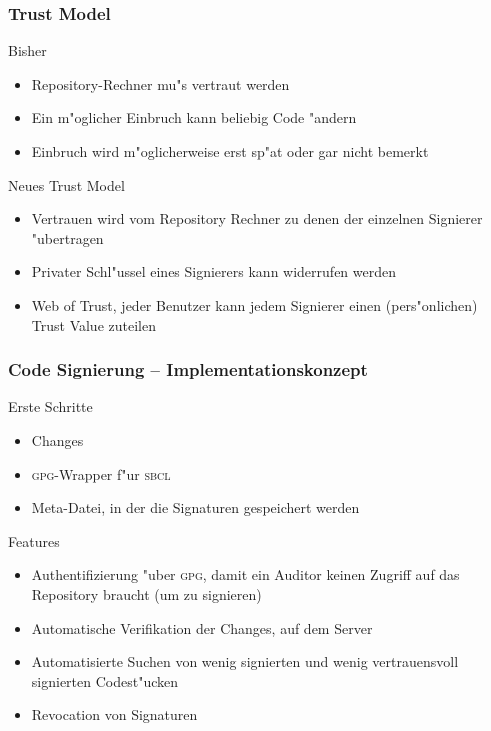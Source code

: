 \documentclass[german, presentation]{beamer}
\newcommand{\GPG}{\textsc{gpg}}
\newcommand{\SBCL}{\textsc{sbcl}}
\begin{document}
\begin{frame}
  \frametitle{Trust Model}
  \begin{block}{Bisher}
    \begin{itemize}
      \item Repository-Rechner mu"s vertraut werden
      \item Ein m"oglicher Einbruch kann beliebig Code "andern
      \item Einbruch wird m"oglicherweise erst sp"at oder gar nicht bemerkt
    \end{itemize}
  \end{block}
  \begin{block}{Neues Trust Model}
    \begin{itemize}
      \item Vertrauen wird vom Repository Rechner zu denen
         der einzelnen Signierer "ubertragen
      \item Privater Schl"ussel eines Signierers kann widerrufen werden
      \item Web of Trust, jeder Benutzer kann jedem Signierer
         einen (pers"onlichen) Trust Value zuteilen
    \end{itemize}
  \end{block}
\end{frame}

\begin{frame}
  \frametitle{Code Signierung -- Implementationskonzept}
  \begin{block}{Erste Schritte}
    \begin{itemize}
      \item Changes
      \item \GPG{}-Wrapper f"ur \SBCL
      \item Meta-Datei, in der die Signaturen gespeichert werden
    \end{itemize}
  \end{block}
  \begin{block}{Features}
    \begin{itemize}
      \item Authentifizierung "uber \GPG{}, damit ein Auditor keinen Zugriff
        auf das Repository braucht (um zu signieren)
      \item Automatische Verifikation der Changes, auf dem Server
      \item Automatisierte Suchen von wenig signierten und wenig
        vertrauensvoll signierten Codest"ucken
      \item Revocation von Signaturen
    \end{itemize}
  \end{block}
\end{frame}
\end{document}
